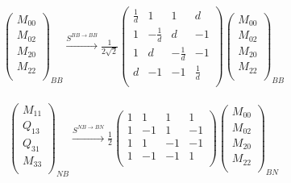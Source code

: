 \documentclass[12pt,a4paper]{article}
\newcounter{arrow}
\begin{document}
\begin{align}
\left( \begin{matrix}
M_{00}\\
M_{02}\\
M_{20}\\
M_{22}\\
\end{matrix} \right)_{BB}
\xrightarrow{S^{BB \rightarrow BB}}
\frac{1}{2 \sqrt{2}} \left( \begin{matrix}
\frac{1}{d}&1&1&d \\
1& -\frac{1}{d} & d &-1 \\
1& d& -\frac{1}{d} & -1 \\
d & -1& -1& \frac{1}{d}\\
\end{matrix} \right)
\left( \begin{matrix}
M_{00}\\
M_{02}\\
M_{20}\\
M_{22}\\
\end{matrix} \right)_{BB}
\end{align}

\begin{align}
\left( \begin{matrix}
M_{11}\\
Q_{13}\\
Q_{31}\\
M_{33}\\
\end{matrix} \right)_{NB}
\xrightarrow{S^{NB \rightarrow BN}}
\frac{1}{2} \left( \begin{matrix}
1&1&1&1\\
1&-1&1&-1\\
1&1&-1&-1\\
1&-1&-1&1\\
\end{matrix} \right)
\left( \begin{matrix}
M_{00}\\
M_{02}\\
M_{20}\\
M_{22}\\
\end{matrix} \right)_{BN}
\end{align}
\end{document}
